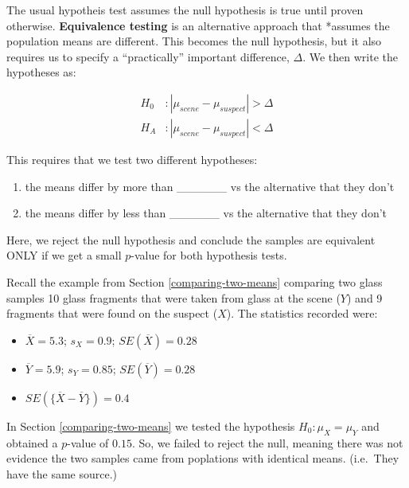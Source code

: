 \documentclass[]{book}
\providecommand{\tightlist}{%
  \setlength{\itemsep}{0pt}\setlength{\parskip}{0pt}}
\theoremstyle{definition}
\theoremstyle{definition}
\theoremstyle{remark}
\begin{document}
The usual hypotheis test assumes the null hypothesis is true until
proven otherwise. \textbf{Equivalence testing} is an alternative
approach that *assumes the population means are different. This becomes
the null hypothesis, but it also requires us to specify a
``practically'' important difference, \(\Delta\). We then write the
hypotheses as:

\begin{equation}\label{eq:et}
\begin{split}
H_0 & :  |\mu_{scene} - \mu_{suspect} | > \Delta  \\
H_A & :  |\mu_{scene} - \mu_{suspect} | < \Delta  
\end{split}
\end{equation}

This requires that we test two different hypotheses:

\begin{enumerate}
\def\labelenumi{\arabic{enumi}.}
\tightlist
\item
  the means differ by more than \_\_\_\_\_\_ vs the alternative that
  they don't \vspace{.1in}
\item
  the means differ by less than \_\_\_\_\_\_ vs the alternative that
  they don't
\end{enumerate}

Here, we reject the null hypothesis and conclude the samples are
equivalent ONLY if we get a small \(p\)-value for both hypothesis tests.

Recall the example from Section \ref{comparing-two-means} comparing two
glass samples 10 glass fragments that were taken from glass at the scene
(\(Y\)) and 9 fragments that were found on the suspect (\(X\)). The
statistics recorded were:

\begin{itemize}
\tightlist
\item
  \(\overline{X} = 5.3\); \(s_X = 0.9\); \(SE(\overline{X}) = 0.28\)
  \vspace{.1in}
\item
  \(\overline{Y} = 5.9\); \(s_Y = 0.85\); \(SE(\overline{Y}) = 0.28\)
  \vspace{.1in}
\item
  \(SE(\{\overline{X} - \overline{Y}\}) = 0.4\)
\end{itemize}

In Section \ref{comparing-two-means} we tested the hypothesis
\(H_0 : \mu_X = \mu_Y\) and obtained a \(p\)-value of \(0.15\). So, we
failed to reject the null, meaning there was not evidence the two
samples came from poplations with identical means. (i.e.~They have the
same source.)
\end{document}
